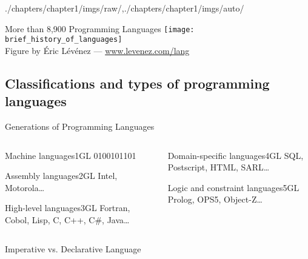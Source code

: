 \begin{graphicspathcontext}{{./chapters/chapter1/imgs/raw/},{./chapters/chapter1/imgs/auto/}}
\begin{bibunit}[apalike]
\begin{frame}{{More than 8,900} Programming Languages}
	\texttt{[image: brief\_history\_of\_languages]} \\
	Figure by \'Eric L\'ev\'enez --- \url{www.levenez.com/lang}
\end{frame}

\subsection{Classifications and types of programming languages}
\subsectiontableofcontentslide

\begin{frame}{Generations of Programming Languages}
	\begin{columns}
		\begin{column}{.5\linewidth}
			\begin{rightanchorblock}{Machine languages}{1GL}
				0100101101
			\end{rightanchorblock}
			\vspace{0.5cm}
			\begin{rightanchorblock}{Assembly languages}{2GL}
				Intel, Motorola\dots
			\end{rightanchorblock}
			\vspace{0.5cm}
			\begin{rightanchorblock}{High-level languages}{3GL}
				Fortran, Cobol, Lisp, C, C++, C\#, Java\dots
			\end{rightanchorblock}
		\end{column}
		\begin{column}{.5\linewidth}
			\begin{leftanchorblock}{Domain-specific languages}{4GL}
				SQL, Postscript, HTML, SARL\dots
			\end{leftanchorblock}
			\vspace{0.5cm}
			\begin{leftanchorblock}{Logic and constraint languages}{5GL}
				Prolog, OPS5, Object-Z\dots
			\end{leftanchorblock}
		\end{column}
	\end{columns}
\end{frame}

\begin{frame}{Imperative vs. Declarative Language}
	\hfill
\end{frame}


\end{bibunit}
\end{graphicspathcontext}
